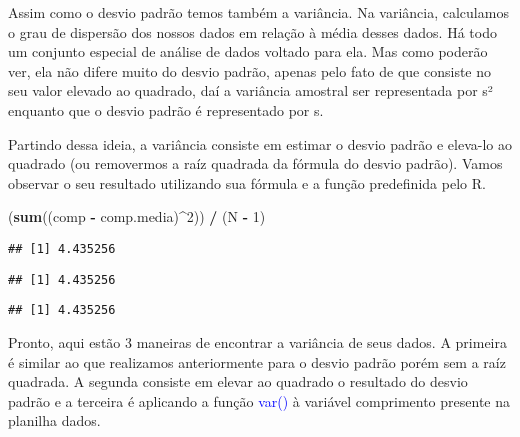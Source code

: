 \documentclass[14pt,titlepage, oneside, openany, a4paper]{book}
\newenvironment{Shaded}{\begin{snugshade}}{\end{snugshade}}
\newcommand{\DecValTok}[1]{\textcolor[rgb]{0.00,0.00,0.81}{#1}}
\newcommand{\KeywordTok}[1]{\textcolor[rgb]{0.13,0.29,0.53}{\textbf{#1}}}
\newcommand{\NormalTok}[1]{#1}
\newcommand{\OperatorTok}[1]{\textcolor[rgb]{0.81,0.36,0.00}{\textbf{#1}}}
\newcommand{\StringTok}[1]{\textcolor[rgb]{0.31,0.60,0.02}{#1}}
\begin{document}
Assim como o desvio padrão temos também a variância. Na variância, calculamos o grau de dispersão dos nossos dados em relação à média desses dados. Há todo um conjunto especial de análise de dados voltado para ela. Mas como poderão ver, ela não difere muito do desvio padrão, apenas pelo fato de que consiste no seu valor elevado ao quadrado, daí a variância amostral ser representada por s² enquanto que o desvio padrão é representado por s.

Partindo dessa ideia, a variância consiste em estimar o desvio padrão e eleva-lo ao quadrado (ou removermos a raíz quadrada da fórmula do desvio padrão). Vamos observar o seu resultado utilizando sua fórmula e a função predefinida pelo R.

\begin{Shaded}
\begin{Highlighting}[]
\NormalTok{(}\KeywordTok{sum}\NormalTok{((comp }\OperatorTok{-}\StringTok{ }\NormalTok{comp.media)}\OperatorTok{^}\DecValTok{2}\NormalTok{)) }\OperatorTok{/}\StringTok{ }\NormalTok{(N }\OperatorTok{-}\StringTok{ }\DecValTok{1}\NormalTok{)}
\end{Highlighting}
\end{Shaded}

\begin{verbatim}
## [1] 4.435256
\end{verbatim}

\begin{Shaded}
\end{Shaded}

\begin{verbatim}
## [1] 4.435256
\end{verbatim}

\begin{Shaded}
\end{Shaded}

\begin{verbatim}
## [1] 4.435256
\end{verbatim}

Pronto, aqui estão 3 maneiras de encontrar a variância de seus dados. A primeira é similar ao que realizamos anteriormente para o desvio padrão porém sem a raíz quadrada. A segunda consiste em elevar ao quadrado o resultado do desvio padrão e a terceira é aplicando a função \textcolor{blue}{var()} à variável comprimento presente na planilha dados.
\end{document}
